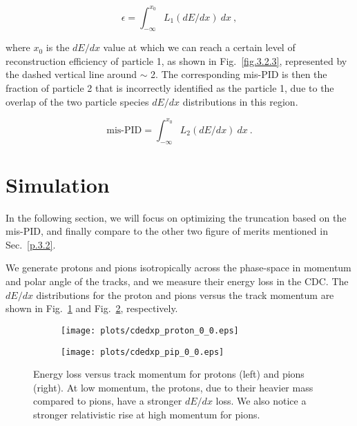 \begin{equation}
    \label{eq.3.3.2.1}
    \epsilon = \int_{-\infty}^{x_{0}} L_{1}(dE/dx)~dx~,
\end{equation}

\noindent where $x_{0}$ is the $dE/dx$ value at which we can reach a certain level of reconstruction efficiency of particle 1, as shown in Fig.~\ref{fig.3.2.3}, represented by the dashed vertical line around $\sim$ 2. The corresponding mis-PID is then the fraction of particle 2 that is incorrectly identified as the particle 1, due to the overlap of the two particle species $dE/dx$ distributions in this region. 

\begin{equation}
    \label{eq.3.3.2}
    \mbox{mis-PID} = \int_{-\infty}^{x_{0}} L_{2}(dE/dx)~dx~.
\end{equation}

\section{Simulation}
\label{p.3.3}

In the following section, we will focus on optimizing the truncation based on the mis-PID, and finally compare to the other two figure of merits mentioned in Sec.~\ref{p.3.2}.
~\par We generate protons and pions isotropically across the phase-space in momentum and polar angle of the tracks, and we measure their energy loss in the CDC. The $dE/dx$ distributions for the proton and pions versus the track momentum are shown in Fig.~\ref{fig.3.4.a} and Fig.~\ref{fig.3.4.b}, respectively.

\begin{figure}[H]
    \centering
    \begin{subfigure}[b]{0.5\textwidth}
        \texttt{[image: plots/cdedxp\_proton\_0\_0.eps]}
        \caption{}
        \label{fig.3.4.a} 
    \end{subfigure}\hfill
    \begin{subfigure}[b]{0.5\textwidth}
        \texttt{[image: plots/cdedxp\_pip\_0\_0.eps]}
        \caption{}
        \label{fig.3.4.b} 
    \end{subfigure}
    \caption{Energy loss versus track momentum for protons (left) and pions (right). At low momentum, the protons, due to their heavier mass compared to pions, have a stronger $dE/dx$ loss. We also notice a stronger relativistic rise at high momentum for pions.}
    \label{fig.3.4}
\end{figure}

